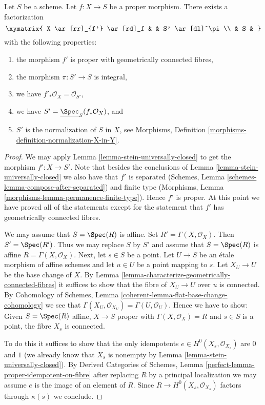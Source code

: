 \begin{theorem}
\label{theorem-stein-factorization-general}
Let $S$ be a scheme.
Let $f : X \to S$ be a proper morphism.
There exists a factorization
$$
\xymatrix{
X \ar[rr]_{f'} \ar[rd]_f & & S' \ar[dl]^\pi \\
& S &
}
$$
with the following properties:
\begin{enumerate}
\item the morphism $f'$ is proper with geometrically connected fibres,
\item the morphism $\pi : S' \to S$ is integral,
\item we have $f'_*\mathcal{O}_X = \mathcal{O}_{S'}$,
\item we have $S' = \underline{\Spec}_S(f_*\mathcal{O}_X)$, and
\item $S'$ is the normalization of $S$ in $X$, see
Morphisms, Definition \ref{morphisms-definition-normalization-X-in-Y}.
\end{enumerate}
\end{theorem}

\begin{proof}
We may apply Lemma \ref{lemma-stein-universally-closed} to get the
morphism $f' : X \to S'$.
Note that besides the
conclusions of Lemma \ref{lemma-stein-universally-closed} we
also have that $f'$ is separated
(Schemes, Lemma \ref{schemes-lemma-compose-after-separated})
and finite type
(Morphisms, Lemma \ref{morphisms-lemma-permanence-finite-type}).
Hence $f'$ is proper. At this point we have proved all of the
statements except for the statement
that $f'$ has geometrically connected fibres.

\medskip\noindent
We may assume that $S = \Spec(R)$ is affine.
Set $R' = \Gamma(X, \mathcal{O}_X)$. Then $S' = \Spec(R')$.
Thus we may replace $S$ by $S'$ and assume that
$S = \Spec(R)$ is affine $R = \Gamma(X, \mathcal{O}_X)$.
Next, let $s \in S$ be a point. Let $U \to S$ be an \'etale morphism
of affine schemes and let $u \in U$ be a point mapping to $s$.
Let $X_U \to U$ be the base change of $X$. By
Lemma \ref{lemma-characterize-geometrically-connected-fibres}
it suffices to show that the fibre of $X_U \to U$ over $u$ is
connected. By
Cohomology of Schemes, Lemma \ref{coherent-lemma-flat-base-change-cohomology}
we see that
$\Gamma(X_U, \mathcal{O}_{X_U}) = \Gamma(U, \mathcal{O}_U)$.
Hence we have to show: Given
$S = \Spec(R)$ affine, $X \to S$ proper with $\Gamma(X, \mathcal{O}_X) = R$
and $s \in S$ is a point, the fibre $X_s$ is connected.

\medskip\noindent
To do this it suffices to show that the only idempotents
$e \in H^0(X_s, \mathcal{O}_{X_s})$ are $0$ and $1$ (we already
know that $X_s$ is nonempty by Lemma \ref{lemma-stein-universally-closed}).
By Derived Categories of Schemes, Lemma
\ref{perfect-lemma-proper-idempotent-on-fibre}
after replacing $R$ by a principal localization
we may assume $e$ is the image of an element of $R$.
Since $R \to H^0(X_s, \mathcal{O}_{X_s})$ factors through
$\kappa(s)$ we conclude.
\end{proof}

